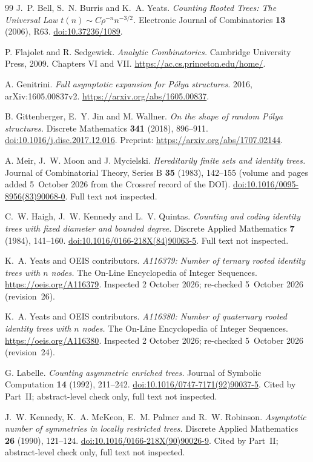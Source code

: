 \documentclass[11pt]{article}
\theoremstyle{definition}\newtheorem{definition}[theorem]{Definition}
\theoremstyle{remark}\newtheorem{remark}[theorem]{Remark}
\begin{document}
\begin{thebibliography}{99}
J.~P. Bell, S.~N. Burris and K.~A. Yeats.
\emph{Counting Rooted Trees: The Universal Law $t(n)\sim C\rho^{-n}n^{-3/2}$.}
Electronic Journal of Combinatorics \textbf{13} (2006), R63.
\href{https://doi.org/10.37236/1089}{doi:10.37236/1089}.

P. Flajolet and R. Sedgewick.
\emph{Analytic Combinatorics.}
Cambridge University Press, 2009.
Chapters VI and VII.
\url{https://ac.cs.princeton.edu/home/}.

A. Genitrini.
\emph{Full asymptotic expansion for P\'olya structures.}
2016, arXiv:1605.00837v2.
\url{https://arxiv.org/abs/1605.00837}.

B. Gittenberger, E.~Y. Jin and M. Wallner.
\emph{On the shape of random P\'olya structures.}
Discrete Mathematics \textbf{341} (2018), 896--911.
\href{https://doi.org/10.1016/j.disc.2017.12.016}{doi:10.1016/j.disc.2017.12.016}.
Preprint: \url{https://arxiv.org/abs/1707.02144}.

A. Meir, J.~W. Moon and J. Mycielski.
\emph{Hereditarily finite sets and identity trees.}
Journal of Combinatorial Theory, Series B \textbf{35} (1983), 142--155
(volume and pages added 5~October 2026 from the Crossref record of the DOI).
\href{https://doi.org/10.1016/0095-8956(83)90068-0}{doi:10.1016/0095-8956(83)90068-0}.
Full text not inspected.

C.~W. Haigh, J.~W. Kennedy and L.~V. Quintas.
\emph{Counting and coding identity trees with fixed diameter and bounded degree.}
Discrete Applied Mathematics \textbf{7} (1984), 141--160.
\href{https://doi.org/10.1016/0166-218X(84)90063-5}{doi:10.1016/0166-218X(84)90063-5}.
Full text not inspected.

K.~A. Yeats and OEIS contributors.
\emph{A116379: Number of ternary rooted identity trees with $n$ nodes.}
The On-Line Encyclopedia of Integer Sequences.
\url{https://oeis.org/A116379}. Inspected 2 October 2026; re-checked
5~October 2026 (revision~26).

K.~A. Yeats and OEIS contributors.
\emph{A116380: Number of quaternary rooted identity trees with $n$ nodes.}
The On-Line Encyclopedia of Integer Sequences.
\url{https://oeis.org/A116380}. Inspected 2 October 2026; re-checked
5~October 2026 (revision~24).

G. Labelle.
\emph{Counting asymmetric enriched trees.}
Journal of Symbolic Computation \textbf{14} (1992), 211--242.
\href{https://doi.org/10.1016/0747-7171(92)90037-5}{doi:10.1016/0747-7171(92)90037-5}.
Cited by Part~II; abstract-level check only, full text not inspected.

J.~W. Kennedy, K.~A. McKeon, E.~M. Palmer and R.~W. Robinson.
\emph{Asymptotic number of symmetries in locally restricted trees.}
Discrete Applied Mathematics \textbf{26} (1990), 121--124.
\href{https://doi.org/10.1016/0166-218X(90)90026-9}{doi:10.1016/0166-218X(90)90026-9}.
Cited by Part~II; abstract-level check only, full text not inspected.
\end{thebibliography}
\end{document}
